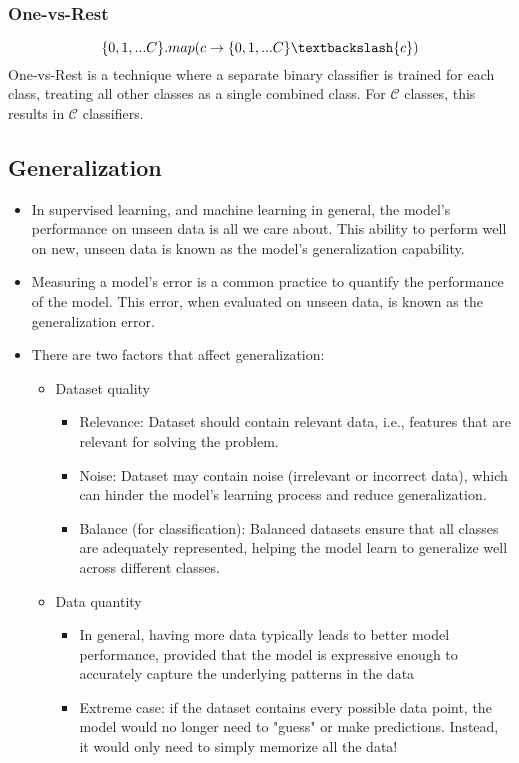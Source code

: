 \documentclass{article}
\begin{document}
\subsubsection*{One-vs-Rest}
\[\{0, 1, ... C\}.map(c \rightarrow \{0, 1, ... C\} \textbackslash \{c\})\]
One-vs-Rest is a technique where a separate binary classifier is trained for each class, treating all other classes as a single combined class. For $\mathcal{C}$ classes, this results in $\mathcal{C}$ classifiers.


\subsection*{Generalization}
\begin{itemize}
    \item In supervised learning, and machine learning in general, the model's performance on unseen data is all we care about. This ability to perform well on new, unseen data is known as the model's generalization capability. 
    \item Measuring a model's error is a common practice to quantify the performance of the model. This error, when evaluated on unseen data, is known as the generalization error.
    \item There are two factors that affect generalization:
    \begin{itemize}
        \item Dataset quality 
        \begin{itemize}
            \item Relevance: Dataset should contain relevant data, i.e., features that are relevant for solving the problem.
            \item Noise: Dataset may contain noise (irrelevant or incorrect data), which can hinder the model's learning process and reduce generalization.
            \item Balance (for classification): Balanced datasets ensure that all classes are adequately represented, helping the model learn to generalize well across different classes.
        \end{itemize}
        \item Data quantity
        \begin{itemize}
            \item In general, having more data typically leads to better model performance, provided that the model is expressive enough to accurately capture the underlying patterns in the data
            \item Extreme case: if the dataset contains every possible data point, the model would no longer need to "guess" or make predictions. Instead, it would only need to simply memorize all the data!

\end{itemize}
\end{itemize}
\end{itemize}
\end{document}
